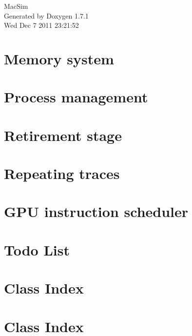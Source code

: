 \documentclass[a4paper]{book}
\begin{document}
\hypersetup{pageanchor=false}
\begin{titlepage}
\vspace*{7cm}
\begin{center}
{\Large MacSim }\\
\vspace*{1cm}
{\large Generated by Doxygen 1.7.1}\\
\vspace*{0.5cm}
{\small Wed Dec 7 2011 23:21:52}\\
\end{center}
\end{titlepage}
\clearemptydoublepage
{}
\tableofcontents
\clearemptydoublepage
{}
\hypersetup{pageanchor=true}
\chapter{Memory system}
\label{memory}
\hypertarget{memory}{}

\chapter{Process management}
\label{process}
\hypertarget{process}{}

\chapter{Retirement stage}
\label{retire}
\hypertarget{retire}{}

\chapter{Repeating traces}
\label{repeat}
\hypertarget{repeat}{}

\chapter{GPU instruction scheduler}
\label{page1}
\hypertarget{page1}{}

\chapter{Todo List}
\label{todo}
\hypertarget{todo}{}

\chapter{Class Index}

\chapter{Class Index}

\end{document}
